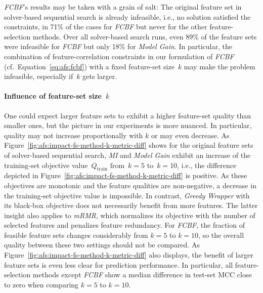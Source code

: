 \documentclass{article}
\theoremstyle{definition}
\begin{document}
\emph{FCBF}'s results may be taken with a grain of salt:
The original feature set in solver-based sequential search is already infeasible, i.e., no solution satisfied the constraints, in 71\% of the cases for \emph{FCBF} but never for the other feature-selection methods.
Over all solver-based search runs, even 89\% of the feature sets were infeasible for \emph{FCBF} but only 18\% for \emph{Model Gain}.
In particular, the combination of feature-correlation constraints in our formulation of \emph{FCBF} (cf.~Equation~\ref{eq:afs:fcbf}) with a fixed feature-set size~$k$ may make the problem infeasible, especially if~$k$ gets larger.

\paragraph{Influence of feature-set size~$k$}

One could expect larger feature sets to exhibit a higher feature-set quality than smaller ones, but the picture in our experiments is more nuanced.
In particular, quality may not increase proportionally with $k$ or may even decrease.
As Figure~\ref{fig:afs:impact-fs-method-k-metric-diff} shows for the original feature sets of solver-based sequential search, \emph{MI} and \emph{Model Gain} exhibit an increase of the training-set objective value~$Q_\text{train}$ from~$k=5$ to~$k=10$, i.e., the difference depicted in Figure~\ref{fig:afs:impact-fs-method-k-metric-diff} is positive.
As these objectives are monotonic and the feature qualities are non-negative, a decrease in the training-set objective value is impossible.
In contrast, \emph{Greedy Wrapper} with its black-box objective does not necessarily benefit from more features.
The latter insight also applies to \emph{mRMR}, which normalizes its objective with the number of selected features and penalizes feature redundancy.
For \emph{FCBF}, the fraction of feasible feature sets changes considerably from $k=5$ to $k=10$, so the overall quality between these two settings should not be compared.
As Figure~\ref{fig:afs:impact-fs-method-k-metric-diff} also displays, the benefit of larger feature sets is even less clear for prediction performance.
In particular, all feature-selection methods except \emph{FCBF} show a median difference in test-set MCC close to zero when comparing $k=5$ to $k=10$.
\end{document}
